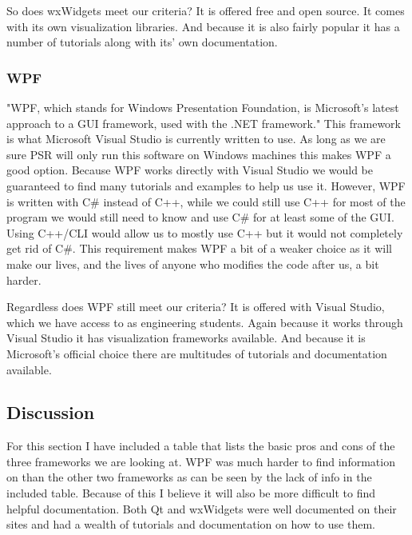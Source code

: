 \documentclass[onecolumn, draftclsnofoot,10pt, compsoc]{IEEEtran}
\begin{document}
So does wxWidgets meet our criteria? It is offered free and open source. It comes with its own visualization libraries. And because it is also fairly popular it has a number of tutorials along with its' own documentation.


\subsubsection{WPF}
"WPF, which stands for Windows Presentation Foundation, is Microsoft's latest approach to a GUI framework, used with the .NET framework." \cite{wpf}
This framework is what Microsoft Visual Studio is currently written to use. 
As long as we are sure PSR will only run this software on Windows machines this makes WPF a good option.
Because WPF works directly with Visual Studio we would be guaranteed to find many tutorials and examples to help us use it. 
However, WPF is written with C\# instead of C++, while we could still use C++ for most of the program we would still need to know and use C\# for at least some of the GUI. 
Using C++/CLI would allow us to mostly use C++ but it would not completely get rid of C\#. 
This requirement makes WPF a bit of a weaker choice as it will make our lives, and the lives of anyone who modifies the code after us, a bit harder.

Regardless does WPF still meet our criteria? 
It is offered with Visual Studio, which we have access to as engineering students.
Again because it works through Visual Studio it has visualization frameworks available. 
And because it is Microsoft's official choice there are multitudes of tutorials and documentation available.

\subsection{Discussion}
For this section I have included a table that lists the basic pros and cons of the three frameworks we are looking at.
WPF was much harder to find information on than the other two frameworks as can be seen by the lack of info in the included table. 
Because of this I believe it will also be more difficult to find helpful documentation. 
Both Qt and wxWidgets were well documented on their sites and had a wealth of tutorials and documentation on how to use them.
\end{document}
